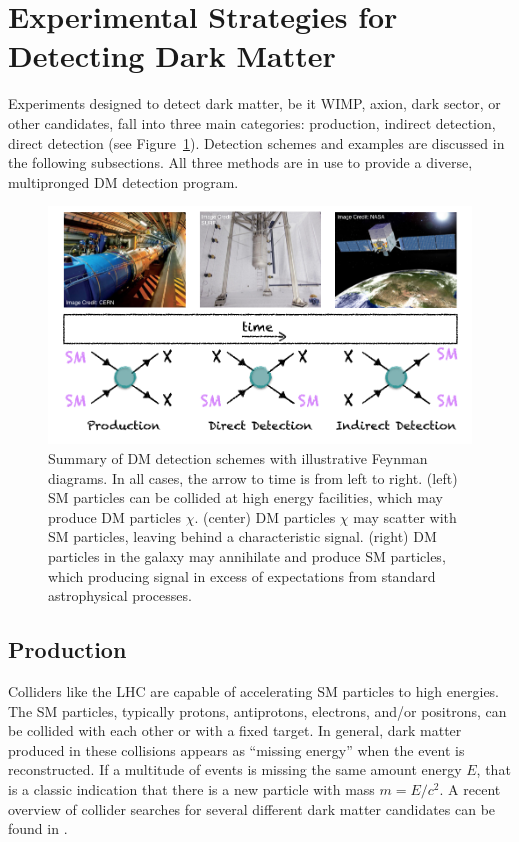 \section{Experimental Strategies for Detecting Dark Matter}
\label{sec:dm_detection_schemes}
Experiments designed to detect dark matter, be it \ac{WIMP}, axion, dark sector, or other candidates, fall into three main categories: production, indirect detection, direct detection (see Figure~\ref{fig:dm_detection_schemes}). Detection schemes and examples are discussed in the following subsections. All three methods are in use to provide a diverse, multipronged \ac{DM} detection program. 

\begin{figure}[htbp]
\begin{center}
\includegraphics[width=\textwidth]{figures/theory/dm_detection_schemes.png}
\caption{Summary of \ac{DM} detection schemes with illustrative Feynman diagrams. In all cases, the arrow to time is from left to right. (left) \ac{SM} particles can be collided at high energy facilities, which may produce \ac{DM} particles $\chi$. (center) \ac{DM} particles $\chi$ may scatter with \ac{SM} particles, leaving behind a characteristic signal. (right) \ac{DM} particles in the galaxy may annihilate and produce \ac{SM} particles, which producing signal in excess of expectations from standard astrophysical processes.}
\label{fig:dm_detection_schemes}
\end{center}
\end{figure}

\subsection{Production}
Colliders like the \ac{LHC} are capable of accelerating \ac{SM} particles to high energies. The \ac{SM} particles, typically protons, antiprotons, electrons, and/or positrons, can be collided with each other or with a fixed target. In general, dark matter produced in these collisions appears as ``missing energy'' when the event is reconstructed. If a multitude of events is missing the same amount energy $E$, that is a classic indication that there is a new particle with mass $m = E/c^{2}$. A recent overview of collider searches for several different dark matter candidates can be found in \cite{Penning2018}. 

